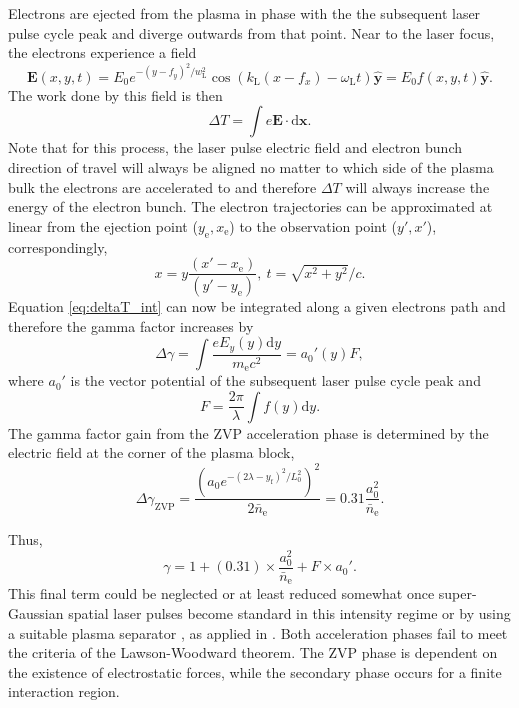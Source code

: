  Electrons are ejected from the plasma in phase with the the subsequent laser pulse cycle peak and diverge outwards from that point. Near to the laser focus, the electrons experience a field
 \begin{equation}\label{eq:Ey_ejection}
 	\mathbf{E}(x,y,t) = E_0 e^{-(y-f_y)^2/w_\mathrm{L}^2}\cos(k_\mathrm{L}(x-f_x) - \omega_\mathrm{L}t) \mathbf{\hat{y}}= E_0 f(x,y,t)  \mathbf{\hat{y}}.
 \end{equation}
The work done by this field is then
\begin{equation}\label{eq:deltaT_int}
	\Delta T = \int e \mathbf{E} \cdot \mathrm{d}\mathbf{x}.
\end{equation}
Note that for this process, the laser pulse electric field and electron bunch direction of travel will always be aligned no matter to which side of the plasma bulk the electrons are accelerated to and therefore $\Delta T$ will always increase the energy of the electron bunch. The electron trajectories can be approximated at linear from the ejection point ($y_\mathrm{e},x_\mathrm{e}$) to the observation point ($y',x'$), correspondingly,
\begin{equation}
	x = y\frac{(x'-x_\mathrm{e})}{(y'-y_\mathrm{e})}, \ t = \sqrt{x^2 + y^2}/c.
\end{equation}
Equation \ref{eq:deltaT_int} can now be integrated along a given electrons path and therefore the gamma factor increases by
\begin{equation}
	\Delta\gamma = \int\frac{eE_y(y)\mathrm{d}y}{m_\mathrm{e}c^2} = a_0'(y)F,
\end{equation}
where $a_0'$ is the vector potential of the subsequent laser pulse cycle peak and 
\begin{equation}
	F = \frac{2\pi}{\lambda}\int f(y)\mathrm{d}y.
\end{equation}
The gamma factor gain from the ZVP acceleration phase is determined by the electric field at the corner of the plasma block,
\begin{equation}
	\Delta \gamma_\mathrm{ZVP} = \frac{(a_0 e^{-(2\lambda-y_\mathrm{f})^2/L_0^2})^2}{2\bar{n}_\mathrm{e}} = 0.31 \frac{a_0^2}{\bar{n}_\mathrm{e}}.
\end{equation}

Thus,
\begin{equation}\label{eq:gamma}
	\gamma = 1 + (0.31)\times \frac{a_0^2}{\bar{n}_\mathrm{e}} + F\times a_0'.
\end{equation}
This final term could be neglected or at least reduced somewhat once super-Gaussian spatial laser pulses become standard in this intensity regime or by using a suitable plasma separator \cite{miyauchiLaserElectronAcceleration2004}, as applied in \cite{andreevDoubleRelativisticElectron2013}. Both acceleration phases fail to meet the criteria of the Lawson-Woodward theorem. The ZVP phase is dependent on the existence of electrostatic forces, while the secondary phase occurs for a finite interaction region.

